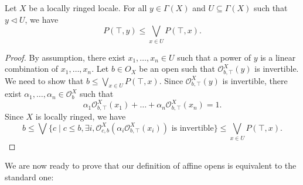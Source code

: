 \documentclass[reqno]{amsart}
\theoremstyle{definition}
\theoremstyle{remark}
\numberwithin{figure}{section}
\newcommand{\cover}{\triangleleft}
\begin{document}
\begin{lem}
Let $X$ be a locally ringed locale.
For all $y \in \Gamma(X)$ and $U \subseteq \Gamma(X)$ such that $y \cover U$, we have
\[ P(\top,y) \leq \bigvee_{x \in U} P(\top,x). \]
\end{lem}
\begin{proof}
By assumption, there exist $x_1, \ldots, x_n \in U$ such that a power of $y$ is a linear combination of $x_1, \ldots, x_n$.
Let $b \in O_X$ be an open such that $\mathcal{O}^X_{b,\top}(y)$ is invertible.
We need to show that $b \leq \bigvee_{x \in U} P(\top,x)$.
Since $\mathcal{O}^X_{b,\top}(y)$ is invertible, there exist $\alpha_1, \ldots, \alpha_n \in \mathcal{O}^X_b$ such that
\[ \alpha_1 \mathcal{O}^X_{b,\top}(x_1) + \ldots + \alpha_n \mathcal{O}^X_{b,\top}(x_n) = 1. \]
Since $X$ is locally ringed, we have
\[ b \leq \bigvee \{ c \mid c \leq b, \exists i, \mathcal{O}^X_{c,b}(\alpha_i \mathcal{O}^X_{b,\top}(x_i)) \text{ is invertible} \} \leq \bigvee_{x \in U} P(\top,x). \]
\end{proof}

We are now ready to prove that our definition of affine opens is equivalent to the standard one:
\end{document}
